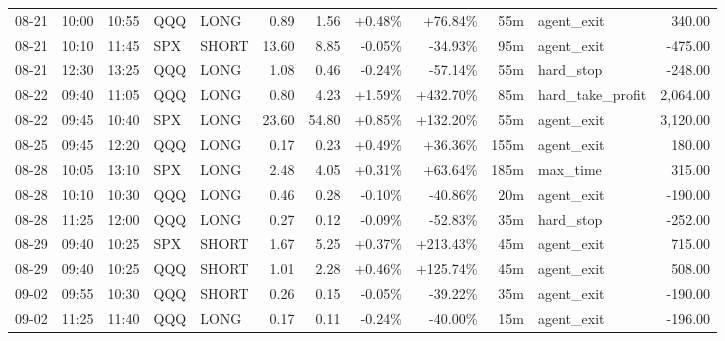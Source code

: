 \documentclass[11pt,a4paper,twoside]{article}
\begin{document}
\begin{center}
\begin{longtable}{>{\color{txtmain}}l l l l l r r r r r >{\color{txtmain}}l r}
08-21 & 10:00 & 10:55 & QQQ & LONG & 0.89 & 1.56 & \textcolor{wingreen}{+0.48\%} & \textcolor{wingreen}{+76.84\%} & 55m & agent\_exit & \textcolor{wingreen}{340.00} \\
08-21 & 10:10 & 11:45 & SPX & SHORT & 13.60 & 8.85 & \textcolor{lossred}{-0.05\%} & \textcolor{lossred}{-34.93\%} & 95m & agent\_exit & \textcolor{lossred}{-475.00} \\
08-21 & 12:30 & 13:25 & QQQ & LONG & 1.08 & 0.46 & \textcolor{lossred}{-0.24\%} & \textcolor{lossred}{-57.14\%} & 55m & hard\_stop & \textcolor{lossred}{-248.00} \\
08-22 & 09:40 & 11:05 & QQQ & LONG & 0.80 & 4.23 & \textcolor{wingreen}{+1.59\%} & \textcolor{wingreen}{+432.70\%} & 85m & hard\_take\_profit & \textcolor{wingreen}{2,064.00} \\
08-22 & 09:45 & 10:40 & SPX & LONG & 23.60 & 54.80 & \textcolor{wingreen}{+0.85\%} & \textcolor{wingreen}{+132.20\%} & 55m & agent\_exit & \textcolor{wingreen}{3,120.00} \\
08-25 & 09:45 & 12:20 & QQQ & LONG & 0.17 & 0.23 & \textcolor{wingreen}{+0.49\%} & \textcolor{wingreen}{+36.36\%} & 155m & agent\_exit & \textcolor{wingreen}{180.00} \\
08-28 & 10:05 & 13:10 & SPX & LONG & 2.48 & 4.05 & \textcolor{wingreen}{+0.31\%} & \textcolor{wingreen}{+63.64\%} & 185m & max\_time & \textcolor{wingreen}{315.00} \\
08-28 & 10:10 & 10:30 & QQQ & LONG & 0.46 & 0.28 & \textcolor{lossred}{-0.10\%} & \textcolor{lossred}{-40.86\%} & 20m & agent\_exit & \textcolor{lossred}{-190.00} \\
08-28 & 11:25 & 12:00 & QQQ & LONG & 0.27 & 0.12 & \textcolor{lossred}{-0.09\%} & \textcolor{lossred}{-52.83\%} & 35m & hard\_stop & \textcolor{lossred}{-252.00} \\
08-29 & 09:40 & 10:25 & SPX & SHORT & 1.67 & 5.25 & \textcolor{wingreen}{+0.37\%} & \textcolor{wingreen}{+213.43\%} & 45m & agent\_exit & \textcolor{wingreen}{715.00} \\
08-29 & 09:40 & 10:25 & QQQ & SHORT & 1.01 & 2.28 & \textcolor{wingreen}{+0.46\%} & \textcolor{wingreen}{+125.74\%} & 45m & agent\_exit & \textcolor{wingreen}{508.00} \\
09-02 & 09:55 & 10:30 & QQQ & SHORT & 0.26 & 0.15 & \textcolor{lossred}{-0.05\%} & \textcolor{lossred}{-39.22\%} & 35m & agent\_exit & \textcolor{lossred}{-190.00} \\
09-02 & 11:25 & 11:40 & QQQ & LONG & 0.17 & 0.11 & \textcolor{lossred}{-0.24\%} & \textcolor{lossred}{-40.00\%} & 15m & agent\_exit & \textcolor{lossred}{-196.00} \\

\end{longtable}
\end{center}
\end{document}
